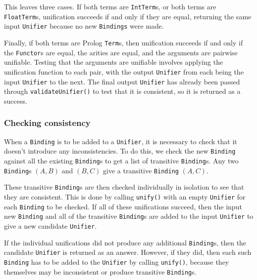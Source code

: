 \documentclass[12pt]{article}
\begin{document}
This leaves three cases. 
If both terms are \verb|IntTerm|s, or both terms are \verb|FloatTerm|s, unification succeeds if and only if they are equal, returning the same input \verb|Unifier| because no new \verb|Bindings| were made. 

Finally, if both terms are Prolog \verb|Term|s, then unification succeeds if and only if the \verb|Functor|s are equal, the arities are equal, and the arguments are pairwise unifiable. 
Testing that the arguments are unifiable involves applying the unification function to each pair, with the output \verb|Unifier| from each being the input \verb|Unifier| to the next. 
The final output \verb|Unifier| has already been passed through \verb|validateUnifier()| to test that it is consistent, so it is returned as a success.

\subsubsection{Checking consistency}


When a \verb|Binding| is to be added to a \verb|Unifier|, it is necessary to check that it doesn't introduce any inconsistencies. 
To do this, we check the new \verb|Binding| against all the existing \verb|Binding|s to get a list of transitive \verb|Binding|s. 
Any two \verb|Binding|s $(A,B)$ and $(B,C)$ give a transitive \verb|Binding| $(A,C)$.

These transitive \verb|Binding|s are then checked individually in isolation to see that they are consistent. 
This is done by calling \verb|unify()| with an empty \verb|Unifier| for each \verb|Binding| to be checked. 
If all of these unifications succeed, then the input new \verb|Binding| and all of the transitive \verb|Binding|s are added to the input \verb|Unifier| to give a new candidate \verb|Unifier|.

If the individual unifications did not produce any additional \verb|Binding|s, then the candidate \verb|Unifier| is returned as an answer. 
However, if they did, then each such \verb|Binding| has to be added to the \verb|Unifier| by calling \verb|unify()|, because they themselves may be inconsistent or produce transitive \verb|Binding|s.
\end{document}
